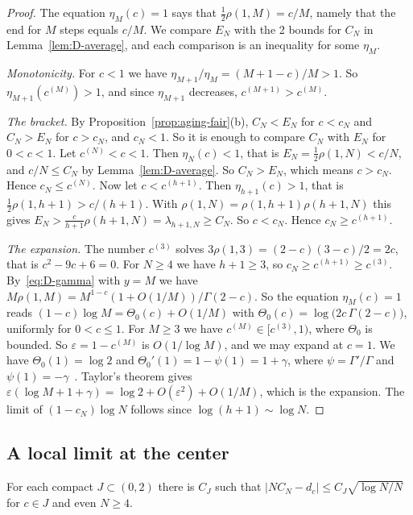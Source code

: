 \begin{proof}
The equation $\eta_M(c)=1$ says that $\frac12\rho(1,M)=c/M$, namely that the
end for $M$ steps equals $c/M$. We compare $E_N$ with the 2 bounds for $C_N$
in Lemma~\ref{lem:D-average}, and each comparison is an inequality for some
$\eta_M$.

\emph{Monotonicity.} For $c<1$ we have $\eta_{M+1}/\eta_M=(M+1-c)/M>1$. So
$\eta_{M+1}(c^{(M)})>1$, and since $\eta_{M+1}$ decreases, $c^{(M+1)}>c^{(M)}$.

\emph{The bracket.} By Proposition~\ref{prop:aging-fair}(b), $C_N<E_N$ for
$c<c_N$ and $C_N>E_N$ for $c>c_N$, and $c_N<1$. So it is enough to compare
$C_N$ with $E_N$ for $0<c<1$. Let $c^{(N)}<c<1$. Then $\eta_N(c)<1$, that is
$E_N=\frac12\rho(1,N)<c/N$, and $c/N\le C_N$ by Lemma~\ref{lem:D-average}. So
$C_N>E_N$, which means $c>c_N$. Hence $c_N\le c^{(N)}$. Now let
$c<c^{(h+1)}$. Then $\eta_{h+1}(c)>1$, that is
$\frac12\rho(1,h+1)>c/(h+1)$. With $\rho(1,N)=\rho(1,h+1)\rho(h+1,N)$ this
gives $E_N>\frac{c}{h+1}\rho(h+1,N)=\lambda_{h+1,N}\ge C_N$. So $c<c_N$.
Hence $c_N\ge c^{(h+1)}$.

\emph{The expansion.} The number $c^{(3)}$ solves
$3\rho(1,3)=(2-c)(3-c)/2=2c$, that is $c^2-9c+6=0$. For $N\ge4$ we have
$h+1\ge3$, so $c_N\ge c^{(h+1)}\ge c^{(3)}$. By~\eqref{eq:D-gamma} with $y=M$
we have $M\rho(1,M)=M^{1-c}(1+O(1/M))/\Gamma(2-c)$. So the equation
$\eta_M(c)=1$ reads $(1-c)\log M=\Theta_0(c)+O(1/M)$ with
$\Theta_0(c)=\log\bigl(2c\,\Gamma(2-c)\bigr)$, uniformly for $0<c\le1$. For
$M\ge3$ we have $c^{(M)}\in[c^{(3)},1)$, where $\Theta_0$ is bounded. So
$\varepsilon=1-c^{(M)}$ is $O(1/\log M)$, and we may expand at $c=1$. We have
$\Theta_0(1)=\log2$ and $\Theta_0'(1)=1-\psi(1)=1+\gamma$, where
$\psi=\Gamma'/\Gamma$ and $\psi(1)=-\gamma$~\cite[5.4.12]{dlmf}. Taylor's
theorem gives
$\varepsilon(\log M+1+\gamma)=\log2+O(\varepsilon^2)+O(1/M)$, which is the
expansion. The limit
of $(1-c_N)\log N$ follows since $\log(h+1)\sim\log N$.
\end{proof}

\subsection{A local limit at the center}

\begin{proposition}\label{prop:D-llt}
For each compact $J\subset(0,2)$ there is $C_J$ such that
$\bigl\lvert NC_N-d_c\bigr\rvert\le C_J\sqrt{\log N/N}$ for $c\in J$
and even $N\ge4$.
\end{proposition}

